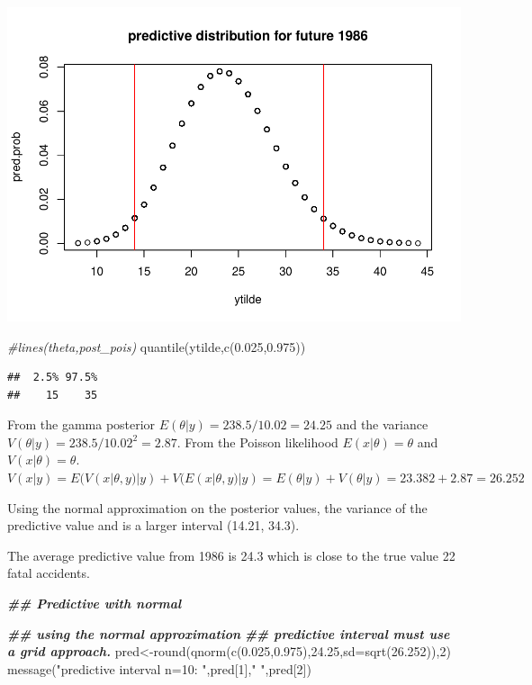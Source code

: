 \documentclass[
]{book}
\newenvironment{Shaded}{\begin{snugshade}}{\end{snugshade}}
\newcommand{\AttributeTok}[1]{\textcolor[rgb]{0.77,0.63,0.00}{#1}}
\newcommand{\CommentTok}[1]{\textcolor[rgb]{0.56,0.35,0.01}{\textit{#1}}}
\newcommand{\DecValTok}[1]{\textcolor[rgb]{0.00,0.00,0.81}{#1}}
\newcommand{\DocumentationTok}[1]{\textcolor[rgb]{0.56,0.35,0.01}{\textbf{\textit{#1}}}}
\newcommand{\FloatTok}[1]{\textcolor[rgb]{0.00,0.00,0.81}{#1}}
\newcommand{\FunctionTok}[1]{\textcolor[rgb]{0.00,0.00,0.00}{#1}}
\newcommand{\NormalTok}[1]{#1}
\newcommand{\OtherTok}[1]{\textcolor[rgb]{0.56,0.35,0.01}{#1}}
\newcommand{\StringTok}[1]{\textcolor[rgb]{0.31,0.60,0.02}{#1}}
\theoremstyle{definition}
\theoremstyle{definition}
\theoremstyle{definition}
\theoremstyle{definition}
\theoremstyle{remark}
\begin{document}
\includegraphics{_main_files/figure-latex/unnamed-chunk-23-2.pdf}

\begin{Shaded}
\begin{Highlighting}[]
 \CommentTok{\#lines(theta,post\_pois)}
 \FunctionTok{quantile}\NormalTok{(ytilde,}\FunctionTok{c}\NormalTok{(}\FloatTok{0.025}\NormalTok{,}\FloatTok{0.975}\NormalTok{))}
\end{Highlighting}
\end{Shaded}

\begin{verbatim}
##  2.5% 97.5% 
##    15    35
\end{verbatim}

From the gamma posterior \(E(\theta | y) = 238.5/10.02=24.25\) and the variance \(V(\theta|y)= 238.5/10.02^2=2.87\). From the Poisson likelihood \(E(x|\theta)=\theta\) and \(V(x|\theta)=\theta\). \(V(x|y)= E(V(x|\theta,y) | y) + V(E(x|\theta,y)|y)= E(\theta| y)+ V(\theta|y) = 23.382+2.87= 26.252\)

Using the normal approximation on the posterior values, the variance of the predictive value and is a larger interval (14.21, 34.3).

The average predictive value from 1986 is 24.3 which is close to the true value 22 fatal accidents.

\begin{Shaded}
\begin{Highlighting}[]
  \DocumentationTok{\#\# Predictive with normal}

\DocumentationTok{\#\# using the normal approximation}
\DocumentationTok{\#\# predictive interval must use a grid approach.}
\NormalTok{     pred}\OtherTok{\textless{}{-}}\FunctionTok{round}\NormalTok{(}\FunctionTok{qnorm}\NormalTok{(}\FunctionTok{c}\NormalTok{(}\FloatTok{0.025}\NormalTok{,}\FloatTok{0.975}\NormalTok{),}\FloatTok{24.25}\NormalTok{,}\AttributeTok{sd=}\FunctionTok{sqrt}\NormalTok{(}\FloatTok{26.252}\NormalTok{)),}\DecValTok{2}\NormalTok{)}
  \FunctionTok{message}\NormalTok{(}\StringTok{"predictive interval n=10: "}\NormalTok{,pred[}\DecValTok{1}\NormalTok{],}\StringTok{" "}\NormalTok{,pred[}\DecValTok{2}\NormalTok{])}
\end{Highlighting}
\end{Shaded}
\end{document}
